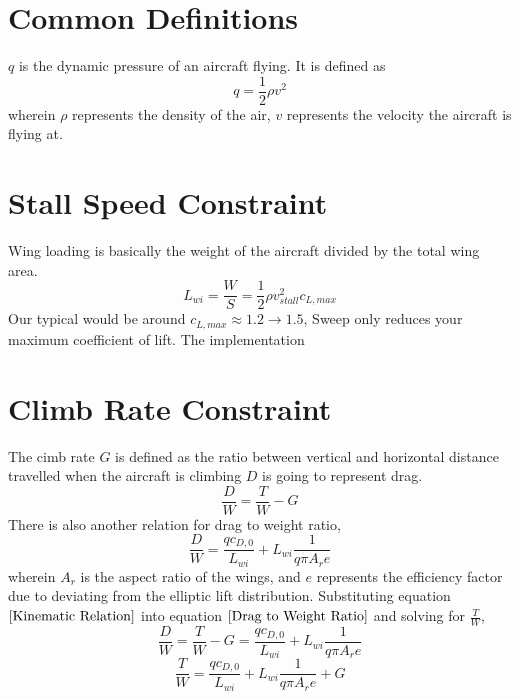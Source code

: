 \documentclass[letter, 12pt]{article}
\begin{document}
\begin{center}
\section{Common Definitions}
\begin{comment}
\end{comment}
$q$ is the dynamic pressure of an aircraft flying. It is defined as
$$q = \frac{1}{2}\rho v^{2}$$
wherein $\rho$ represents the density of the air, $v$ represents the velocity the aircraft is flying at.


\section{Stall Speed Constraint}
\begin{comment}
\end{comment}
Wing loading is basically the weight of the aircraft divided by the total wing area.
$$L_{wi} = \frac{W}{S} = \frac{1}{2}\rho v_{stall}^{2} c_{L,max}$$
Our typical would be around $c_{L,max} \approx 1.2 \to 1.5$, 
Sweep only reduces your maximum coefficient of lift. 
The implementation 



\section{Climb Rate Constraint}
\begin{comment}
\end{comment}
The cimb rate $G$ is defined as the ratio between vertical and horizontal distance travelled when the aircraft is climbing
$D$ is going to represent drag. 
\begin{equation}\frac{D}{W} = \frac{T}{W } - G \label{Kinematic Relation}\end{equation}
There is also another relation for drag to weight ratio,
\begin{equation}\frac{D}{W } = \frac{qc_{D,0}}{L_{wi}} + L_{wi}\frac{1}{q\pi A_{r}e} \label{Drag to Weight Ratio}\end{equation}
wherein $A_{r}$ is the aspect ratio of the wings, and $e$ represents the efficiency factor due to deviating from the elliptic lift distribution.
Substituting equation $\ref{Kinematic Relation}$ into equation $\ref{Drag to Weight Ratio}$ and solving for $\displaystyle\frac{T}{W }$,
$$\frac{D}{W } = \frac{T}{W } - G  = \frac{qc_{D,0}}{L_{wi}} + L_{wi}\frac{1}{q\pi A_{r}e} $$
$$\frac{T}{W }  = \frac{qc_{D,0}}{L_{wi}} + L_{wi}\frac{1}{q\pi A_{r}e} + G $$


\end{center}
\end{document}
